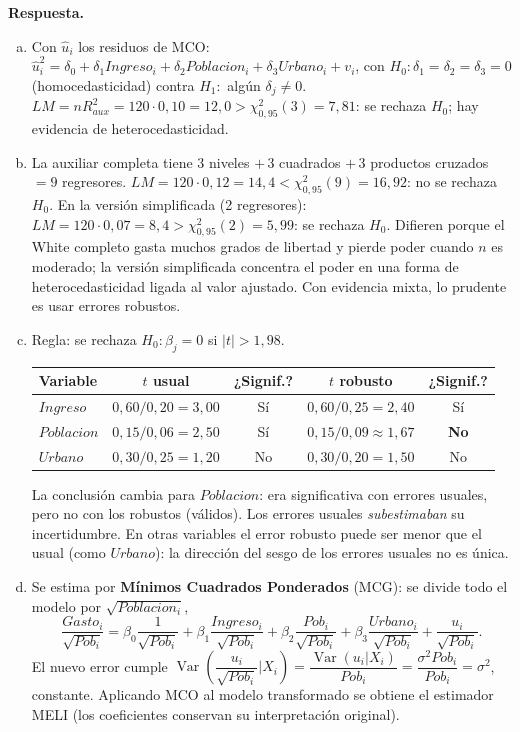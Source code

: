 \documentclass[12pt,letterpaper]{article}
\DeclareMathOperator{\var}{Var}
\newenvironment{resp}{\begingroup\color{blue}\par\noindent\textbf{Respuesta.}\ }{\par\endgroup}
\begin{document}
\begin{enumerate}[1.]
\begin{resp}
\begin{enumerate}[a)]
\item Con $\hat u_i$ los residuos de MCO: $\hat u_i^2=\delta_0+\delta_1Ingreso_i+\delta_2Poblacion_i+\delta_3Urbano_i+v_i$, con $H_0:\delta_1=\delta_2=\delta_3=0$ (homocedasticidad) contra $H_1:$ algún $\delta_j\neq0$. $LM=nR^2_{aux}=120\cdot0{,}10=12{,}0>\chi^2_{0{,}95}(3)=7{,}81$: se rechaza $H_0$; hay evidencia de heterocedasticidad.
\item La auxiliar completa tiene $3$ niveles $+\,3$ cuadrados $+\,3$ productos cruzados $=9$ regresores. $LM=120\cdot0{,}12=14{,}4<\chi^2_{0{,}95}(9)=16{,}92$: no se rechaza $H_0$. En la versión simplificada (2 regresores): $LM=120\cdot0{,}07=8{,}4>\chi^2_{0{,}95}(2)=5{,}99$: se rechaza $H_0$. Difieren porque el White completo gasta muchos grados de libertad y pierde poder cuando $n$ es moderado; la versión simplificada concentra el poder en una forma de heterocedasticidad ligada al valor ajustado. Con evidencia mixta, lo prudente es usar errores robustos.
\item Regla: se rechaza $H_0:\beta_j=0$ si $|t|>1{,}98$.
\begin{center}
\begin{tabular}{lcccc}
\toprule
Variable & $t$ usual & ¿Signif.? & $t$ robusto & ¿Signif.?\\
\midrule
$Ingreso$   & $0{,}60/0{,}20=3{,}00$ & Sí & $0{,}60/0{,}25=2{,}40$ & Sí\\
$Poblacion$ & $0{,}15/0{,}06=2{,}50$ & Sí & $0{,}15/0{,}09\approx1{,}67$ & \textbf{No}\\
$Urbano$    & $0{,}30/0{,}25=1{,}20$ & No & $0{,}30/0{,}20=1{,}50$ & No\\
\bottomrule
\end{tabular}
\end{center}
La conclusión cambia para $Poblacion$: era significativa con errores usuales, pero no con los robustos (válidos). Los errores usuales \emph{subestimaban} su incertidumbre. En otras variables el error robusto puede ser menor que el usual (como $Urbano$): la dirección del sesgo de los errores usuales no es única.
\item Se estima por \textbf{Mínimos Cuadrados Ponderados} (MCG): se divide todo el modelo por $\sqrt{Poblacion_i}$,
\[
\frac{Gasto_i}{\sqrt{Pob_i}}=\beta_0\frac{1}{\sqrt{Pob_i}}+\beta_1\frac{Ingreso_i}{\sqrt{Pob_i}}+\beta_2\frac{Pob_i}{\sqrt{Pob_i}}+\beta_3\frac{Urbano_i}{\sqrt{Pob_i}}+\frac{u_i}{\sqrt{Pob_i}} .
\]
El nuevo error cumple $\var\!\left(\dfrac{u_i}{\sqrt{Pob_i}}\Big|X_i\right)=\dfrac{\var(u_i|X_i)}{Pob_i}=\dfrac{\sigma^2Pob_i}{Pob_i}=\sigma^2$, constante. Aplicando MCO al modelo transformado se obtiene el estimador MELI (los coeficientes conservan su interpretación original).
\end{enumerate}
\end{resp}
\end{enumerate}
\end{document}
